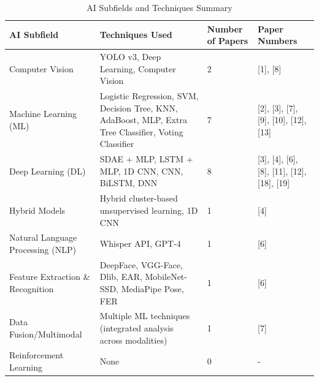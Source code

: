 \documentclass[12pt]{article}
\begin{document}
\begin{table}[H]
\centering
\caption{AI Subfields and Techniques Summary}
\begin{tabular}{|p{4.5cm}|p{6cm}|p{2cm}|p{4cm}|}
\hline
\textbf{AI Subfield} & \textbf{Techniques Used} & \textbf{Number of Papers} & \textbf{Paper Numbers} \\
\hline
Computer Vision & YOLO v3, Deep Learning, Computer Vision & 2 & [1], [8] \\
\hline
Machine Learning (ML) & Logistic Regression, SVM, Decision Tree, KNN, AdaBoost, MLP, Extra Tree Classifier, Voting Classifier & 7 & [2], [3], [7], [9], [10], [12], [13] \\
\hline
Deep Learning (DL) & SDAE + MLP, LSTM + MLP, 1D CNN, CNN, BiLSTM, DNN & 8 & [3], [4], [6], [8], [11], [12], [18], [19] \\
\hline
Hybrid Models & Hybrid cluster-based unsupervised learning, 1D CNN & 1 & [4] \\
\hline
Natural Language Processing (NLP) & Whisper API, GPT-4 & 1 & [6] \\
\hline
Feature Extraction \& Recognition & DeepFace, VGG-Face, Dlib, EAR, MobileNet-SSD, MediaPipe Pose, FER & 1 & [6] \\
\hline
Data Fusion/Multimodal & Multiple ML techniques (integrated analysis across modalities) & 1 & [7] \\
\hline
Reinforcement Learning & None & 0 & - \\
\hline
\end{tabular}
\end{table}
\end{document}
